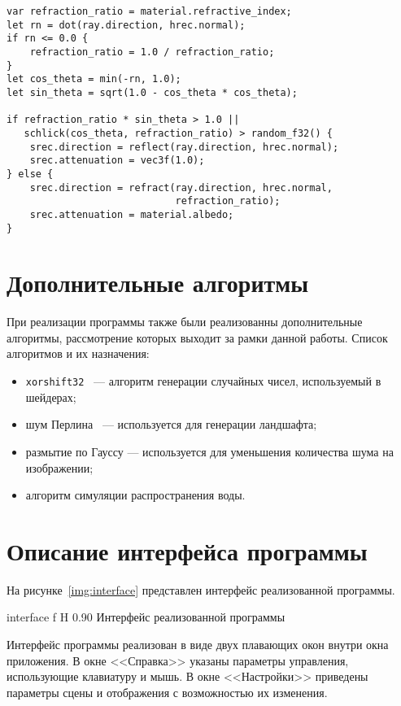 \begin{lstlisting}[caption={Реализация материала воды},label={lst:water},frame=single]
var refraction_ratio = material.refractive_index;
let rn = dot(ray.direction, hrec.normal);
if rn <= 0.0 {
    refraction_ratio = 1.0 / refraction_ratio;
}
let cos_theta = min(-rn, 1.0);
let sin_theta = sqrt(1.0 - cos_theta * cos_theta);

if refraction_ratio * sin_theta > 1.0 || 
   schlick(cos_theta, refraction_ratio) > random_f32() {
    srec.direction = reflect(ray.direction, hrec.normal);
    srec.attenuation = vec3f(1.0);
} else {
    srec.direction = refract(ray.direction, hrec.normal, 
                             refraction_ratio);
    srec.attenuation = material.albedo;
}
\end{lstlisting}

\section{Дополнительные алгоритмы}

При реализации программы также были реализованны дополнительные алгоритмы, рассмотрение 
которых выходит за рамки данной работы. Список алгоритмов и их назначения:
\begin{itemize}
    \item \verb|xorshift32|~\cite{xorshift} --- алгоритм генерации случайных чисел, используемый в шейдерах;
    \item шум Перлина~\cite{perlin} --- используется для генерации ландшафта;
    \item размытие по Гауссу --- используется для уменьшения количества шума на изображении;
    \item алгоритм симуляции распространения воды.
\end{itemize}

\section{Описание интерфейса программы}

На рисунке~\ref{img:interface} представлен интерфейс реализованной программы.

    {interface}
    {f}
    {H}
    {0.90\textwidth}
    {Интерфейс реализованной программы}

Интерфейс программы реализован в виде двух плавающих окон внутри окна приложения.
В окне <<Справка>> указаны параметры управления, использующие клавиатуру и мышь.
В окне <<Настройки>> приведены параметры сцены и отображения с возможностью их изменения.

